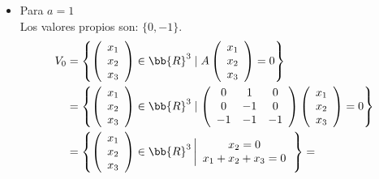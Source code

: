 \begin{ejercicio}
\begin{enumerate}
\begin{itemize}
            \item Para $a=1$\\
            Los valores propios son: $\{0, -1\}$.
            \begin{equation*}\begin{split}
            V_0 & = \left\{ \left(\begin{array}{c}
                    x_1 \\
                    x_2 \\
                    x_3
               \end{array}\right) \in \bb{R}^3 \mid A\left(\begin{array}{c}
                    x_1 \\
                    x_2 \\
                    x_3
               \end{array}\right) = 0 \right\} \\
               & = \left\{ \left(\begin{array}{c}
                    x_1 \\
                    x_2 \\
                    x_3
               \end{array}\right) \in \bb{R}^3 \mid \left( \begin{array}{ccc}
                0 & 1 & 0 \\
                0 & -1 & 0 \\
                -1 & -1 & -1 \\
            \end{array}\right) \left(\begin{array}{c}
                    x_1 \\
                    x_2 \\
                    x_3
               \end{array}\right) = 0 \right\} \\
               & = \left\{ \left(\begin{array}{c}
                    x_1 \\
                    x_2  \\
                    x_3
               \end{array}\right) \in \bb{R}^3 \left|
               \begin{array}{c}
                    x_2=0  \\
                    x_1+x_2+x_3 = 0 
               \end{array}\right. \right\} =

\end{split}
\end{equation*}
\end{itemize}
\end{enumerate}
\end{ejercicio}
